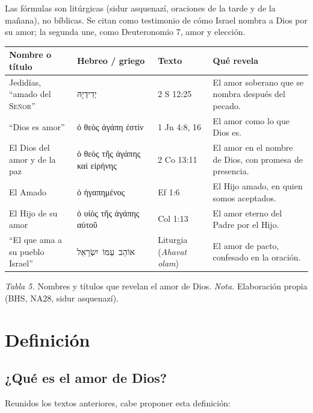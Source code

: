 \documentclass[11pt,letterpaper]{article}
\newcommand{\heb}[1]{\mbox{\foreignlanguage{hebrew}{#1}}}
\newcommand{\grc}[1]{\foreignlanguage{ancientgreek}{#1}}
\newcommand{\SENOR}{\textsc{Señor}}
\begin{document}
\begin{nota}[Precisión]
Las fórmulas son litúrgicas (sidur asquenazí, oraciones de la tarde y de la mañana), no bíblicas. Se citan como testimonio de cómo Israel nombra a Dios por su amor; la segunda une, como Deuteronomio 7, amor y elección.
\end{nota}

\begin{center}\small\renewcommand{\arraystretch}{1.2}
\begin{tabular}{@{}L{3.6cm}L{4.0cm}L{2.4cm}L{4.8cm}@{}}
\toprule
\textbf{Nombre o título} & \textbf{Hebreo / griego} & \textbf{Texto} & \textbf{Qué revela} \\ \midrule
Jedidías, ``amado del \SENOR'' & \heb{יְדִידְיָהּ} & 2 S 12:25 & El amor soberano que se nombra después del pecado. \\
``Dios es amor'' & \grc{ὁ θεὸς ἀγάπη ἐστίν} & 1 Jn 4:8, 16 & El amor como lo que Dios es. \\
El Dios del amor y de la paz & \grc{ὁ θεὸς τῆς ἀγάπης καὶ εἰρήνης} & 2 Co 13:11 & El amor en el nombre de Dios, con promesa de presencia. \\
El Amado & \grc{ὁ ἠγαπημένος} & Ef 1:6 & El Hijo amado, en quien somos aceptados. \\
El Hijo de su amor & \grc{ὁ υἱὸς τῆς ἀγάπης αὐτοῦ} & Col 1:13 & El amor eterno del Padre por el Hijo. \\
``El que ama a su pueblo Israel'' & \heb{אוֹהֵב עַמּוֹ יִשְׂרָאֵל} & Liturgia (\emph{Ahavat olam}) & El amor de pacto, confesado en la oración. \\
\bottomrule
\end{tabular}\par
{\footnotesize\color{gris}\textit{Tabla 5.} Nombres y títulos que revelan el amor de Dios. \textit{Nota.} Elaboración propia (BHS, NA28, sidur asquenazí).}
\end{center}

\section{Definición}

\subsection{¿Qué es el amor de Dios?}
Reunidos los textos anteriores, cabe proponer esta definición:
\end{document}
